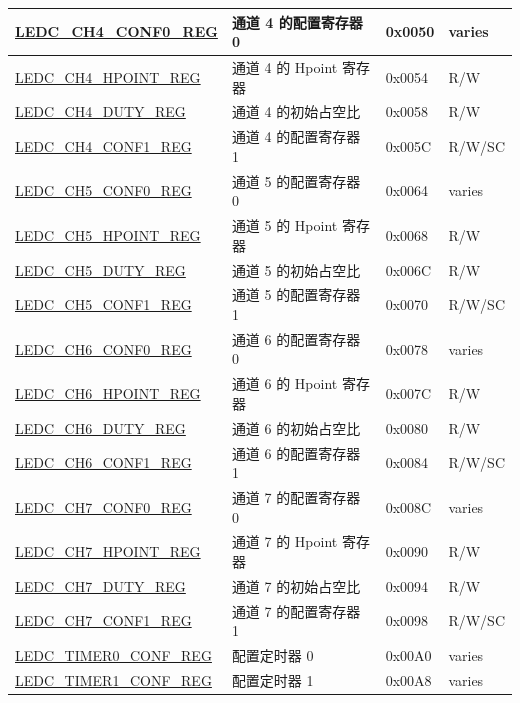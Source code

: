 \begin{longtable}{ | p{6cm} | p{4.5cm} | p{1.3cm} | p{1.7cm} | }
\hyperref[regdesc:LEDCCHNCONF0REG]{LEDC\_CH4\_CONF0\_REG} & 通道 4 的配置寄存器 0 & 0x0050 & varies \\ \hline
\hyperref[regdesc:LEDCCHNHPOINTREG]{LEDC\_CH4\_HPOINT\_REG} & 通道 4 的 Hpoint 寄存器 & 0x0054 & R/W \\ \hline
\hyperref[regdesc:LEDCCHNDUTYREG]{LEDC\_CH4\_DUTY\_REG} & 通道 4 的初始占空比 & 0x0058 & R/W \\ \hline
\hyperref[regdesc:LEDCCHNCONF1REG]{LEDC\_CH4\_CONF1\_REG} & 通道 4 的配置寄存器 1 & 0x005C & R/W/SC \\ \hline
\hyperref[regdesc:LEDCCHNCONF0REG]{LEDC\_CH5\_CONF0\_REG} & 通道 5 的配置寄存器 0 & 0x0064 & varies \\ \hline
\hyperref[regdesc:LEDCCHNHPOINTREG]{LEDC\_CH5\_HPOINT\_REG} & 通道 5 的 Hpoint 寄存器 & 0x0068 & R/W \\ \hline
\hyperref[regdesc:LEDCCHNDUTYREG]{LEDC\_CH5\_DUTY\_REG} & 通道 5 的初始占空比 & 0x006C & R/W \\ \hline
\hyperref[regdesc:LEDCCHNCONF1REG]{LEDC\_CH5\_CONF1\_REG} & 通道 5 的配置寄存器 1 & 0x0070 & R/W/SC \\ \hline
\hyperref[regdesc:LEDCCHNCONF0REG]{LEDC\_CH6\_CONF0\_REG} & 通道 6 的配置寄存器 0 & 0x0078 & varies \\ \hline
\hyperref[regdesc:LEDCCHNHPOINTREG]{LEDC\_CH6\_HPOINT\_REG} & 通道 6 的 Hpoint 寄存器 & 0x007C & R/W \\ \hline
\hyperref[regdesc:LEDCCHNDUTYREG]{LEDC\_CH6\_DUTY\_REG} & 通道 6 的初始占空比 & 0x0080 & R/W \\ \hline
\hyperref[regdesc:LEDCCHNCONF1REG]{LEDC\_CH6\_CONF1\_REG} & 通道 6 的配置寄存器 1 & 0x0084 & R/W/SC \\ \hline
\hyperref[regdesc:LEDCCHNCONF0REG]{LEDC\_CH7\_CONF0\_REG} & 通道 7 的配置寄存器 0 & 0x008C & varies \\ \hline
\hyperref[regdesc:LEDCCHNHPOINTREG]{LEDC\_CH7\_HPOINT\_REG} & 通道 7 的 Hpoint 寄存器 & 0x0090 & R/W \\ \hline
\hyperref[regdesc:LEDCCHNDUTYREG]{LEDC\_CH7\_DUTY\_REG} & 通道 7 的初始占空比 & 0x0094 & R/W \\ \hline
\hyperref[regdesc:LEDCCHNCONF1REG]{LEDC\_CH7\_CONF1\_REG} & 通道 7 的配置寄存器 1 & 0x0098 & R/W/SC \\ \hline
\hyperref[regdesc:LEDCTIMERXCONFREG]{LEDC\_TIMER0\_CONF\_REG} & 配置定时器 0 & 0x00A0 & varies \\ \hline
\hyperref[regdesc:LEDCTIMERXCONFREG]{LEDC\_TIMER1\_CONF\_REG} & 配置定时器 1 & 0x00A8 & varies \\ \hline

\end{longtable}
